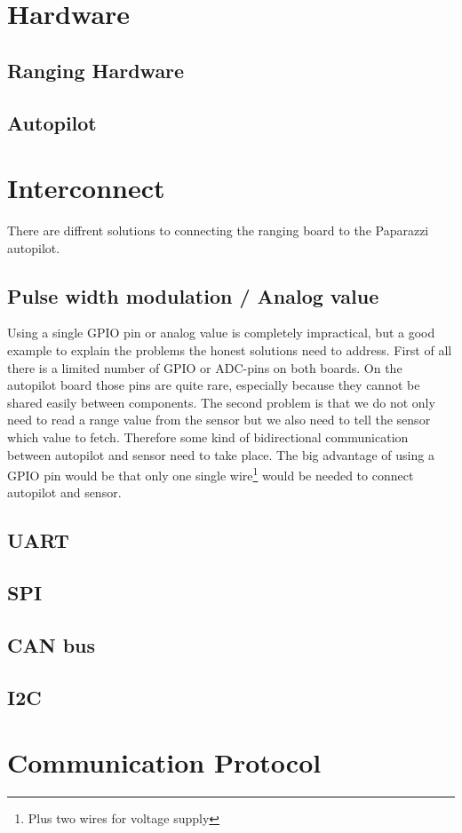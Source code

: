 
\section{Hardware}

\subsection{Ranging Hardware}

\subsection{Autopilot}

\section{Interconnect}
There are diffrent solutions to connecting the ranging board to the Paparazzi autopilot.

\subsection{Pulse width modulation / Analog value}
Using a single GPIO pin or analog value is completely impractical, but a good example to explain the problems the honest solutions need to address.
First of all there is a limited number of GPIO or ADC-pins on both boards.
On the autopilot board those pins are quite rare, especially because they cannot be shared easily between components.
The second problem is that we do not only need to read a range value from the sensor but we also need to tell the sensor which value to fetch.
Therefore some kind of bidirectional communication between autopilot and sensor need to take place.
The big advantage of using a GPIO pin would be that only one single wire\footnote{Plus two wires for voltage supply} would be needed to connect autopilot and sensor.

\subsection{UART}

\subsection{SPI}

\subsection{CAN bus}

\subsection{I2C}

\section{Communication Protocol}



